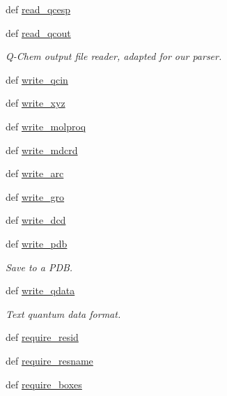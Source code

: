 \begin{DoxyCompactItemize}
def \hyperlink{classforcebalance_1_1molecule_1_1Molecule_a27fb6201b435a3b205ae62f605256f3d}{read\-\_\-qcesp}
\item 
def \hyperlink{classforcebalance_1_1molecule_1_1Molecule_a8c9e71843e7123c57c43c24af2d84f25}{read\-\_\-qcout}
\begin{DoxyCompactList}\small\item\em \-Q-\/\-Chem output file reader, adapted for our parser. \end{DoxyCompactList}\item 
def \hyperlink{classforcebalance_1_1molecule_1_1Molecule_af46b2ba6ef777cf8301bc16e157c724d}{write\-\_\-qcin}
\item 
def \hyperlink{classforcebalance_1_1molecule_1_1Molecule_adc6620e8287edabe161442de12295f75}{write\-\_\-xyz}
\item 
def \hyperlink{classforcebalance_1_1molecule_1_1Molecule_aba14226f272f91c91ecf7060ff136a2b}{write\-\_\-molproq}
\item 
def \hyperlink{classforcebalance_1_1molecule_1_1Molecule_aab5ea35ab9d68559fd6ea7b747c2bddb}{write\-\_\-mdcrd}
\item 
def \hyperlink{classforcebalance_1_1molecule_1_1Molecule_a95782abfb36e7080a1b98bfad2ced4f3}{write\-\_\-arc}
\item 
def \hyperlink{classforcebalance_1_1molecule_1_1Molecule_a503eae2cee228e4cc5fc736504714925}{write\-\_\-gro}
\item 
def \hyperlink{classforcebalance_1_1molecule_1_1Molecule_a0dee435704418bf51199d6bab6d92249}{write\-\_\-dcd}
\item 
def \hyperlink{classforcebalance_1_1molecule_1_1Molecule_a47082443566cd50add3f2ec20af9cc10}{write\-\_\-pdb}
\begin{DoxyCompactList}\small\item\em \-Save to a \-P\-D\-B. \end{DoxyCompactList}\item 
def \hyperlink{classforcebalance_1_1molecule_1_1Molecule_a1ef6aefd3218f8ab3f9dc2b37e602fbf}{write\-\_\-qdata}
\begin{DoxyCompactList}\small\item\em \-Text quantum data format. \end{DoxyCompactList}\item 
def \hyperlink{classforcebalance_1_1molecule_1_1Molecule_a90fe456919fda305703e36af389e60e1}{require\-\_\-resid}
\item 
def \hyperlink{classforcebalance_1_1molecule_1_1Molecule_ad47d05a3ea76e013a628bd7b25ae3050}{require\-\_\-resname}
\item 
def \hyperlink{classforcebalance_1_1molecule_1_1Molecule_a03af3cfb99ea8f1c8c7e93d04bdcf967}{require\-\_\-boxes}
\end{DoxyCompactItemize}

